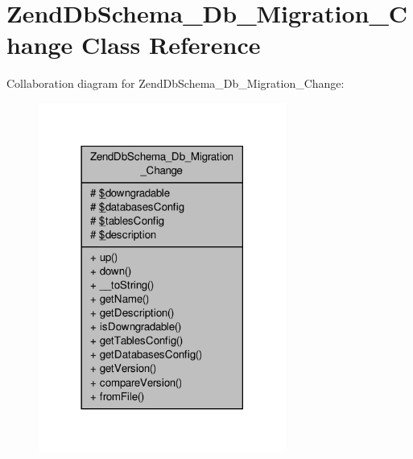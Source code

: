 \hypertarget{classZendDbSchema__Db__Migration__Change}{\section{Zend\-Db\-Schema\-\_\-\-Db\-\_\-\-Migration\-\_\-\-Change Class Reference}
\label{classZendDbSchema__Db__Migration__Change}
}


Collaboration diagram for Zend\-Db\-Schema\-\_\-\-Db\-\_\-\-Migration\-\_\-\-Change\-:\nopagebreak
\begin{figure}[H]
\begin{center}
\leavevmode
\includegraphics[width=230pt]{classZendDbSchema__Db__Migration__Change__coll__graph}
\end{center}
\end{figure}
